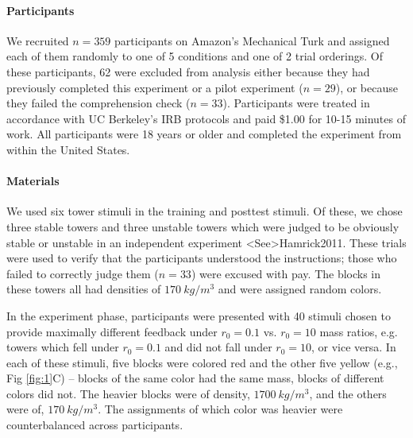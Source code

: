 \documentclass[10pt,letterpaper]{article}
\newcommand{\rlow}[0]{$r_0=0.1$}
\newcommand{\rhigh}[0]{$r_0=10$}
\begin{document}
\paragraph{Participants}

We recruited $n=359$ participants on Amazon's Mechanical Turk and
assigned each of them randomly to one of 5 conditions and one of 2
trial orderings. Of these participants, 62 were excluded from analysis
either because they had previously completed this experiment or a
pilot experiment ($n=29$), or because they failed the comprehension
check ($n=33$). Participants were treated in accordance with UC
Berkeley's IRB protocols and paid \$1.00 for 10-15 minutes of
work. All participants were 18 years or older and completed the
experiment from within the United States.

\paragraph{Materials}


We used six tower stimuli in the training and posttest stimuli. Of
these, we chose three stable towers and three unstable towers which
were judged to be obviously stable or unstable in an independent
experiment \citeA<See>{Hamrick2011}. These trials were used to verify
that the participants understood the instructions; those who failed to
correctly judge them ($n=33$) were excused with pay. The blocks in
these towers all had densities of $170\ kg/m^3$ and were assigned
random colors.

In the experiment phase, participants were presented with 40 stimuli
chosen to provide maximally different feedback under \rlow{}
vs. \rhigh{} mass ratios, e.g. towers which fell under \rlow{} and did
not fall under \rhigh{}, or vice versa. In each of these stimuli, five
blocks were colored red and the other five yellow (e.g., Fig
\ref{fig:1}C) -- blocks of the same color had the same mass, blocks of
different colors did not. The heavier blocks were of density, $1700\
kg/m^3$, and the others were of, $170\ kg/m^3$. The assignments of
which color was heavier were counterbalanced across participants.
\end{document}
